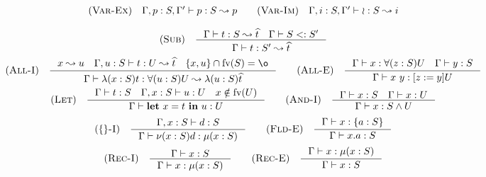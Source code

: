 \[\begin{array}{c}
    \RULE{Var-Ex} \quad \TJ{\Gamma, p: S, \Gamma'}{p}{S}{p} \qquad

    \RULE{Var-Im} \quad \TJ{\Gamma, i: S, \Gamma'}{\IMP}{S}{i} \\[4mm]

    \RULE{Sub} \quad \inference{
        \TJ{\Gamma}{t}{S}{\HAT{t}} \quad
        \SJT{\Gamma}{S}{S'}
    }{
        \TJ{\Gamma}{t}{S'}{\HAT{t}}
    } \\[4mm]

    \RULE{All-I} \quad \inference{
        x \leadsto u \quad
        \TJ{\Gamma, u: S}{t}{U}{\HAT{t}} \quad
        \{x, u\} \cap \FV{S} = \o
    }{
        \TJ{\Gamma}{\ABS{x}{S}{t}}{\DFUN{u}{S}{U}}{\ABS{u}{S}{\HAT{t}}}
    } \qquad

    \RULE{All-E} \quad \inference{
        \TJT{\Gamma}{x}{\DFUN{z}{S}{U}} \quad
        \TJT{\Gamma}{y}{S}
    }{
        \TJT{\Gamma}{x\ y}{\SUB{z}{y}U}
    } \\[4mm]

    \RULE{Let} \quad \inference{
        \TJT{\Gamma}{t}{S} \quad
        \TJT{\Gamma, x: S}{u}{U} \quad
        x \notin \FV{U}
    }{
        \TJT{\Gamma}{\LET{x}{t}{u}}{U}
    } \qquad

    \RULE{And-I} \quad \inference{
        \TJT{\Gamma}{x}{S} \quad
        \TJT{\Gamma}{x}{U}
    }{
        \TJT{\Gamma}{x}{\AGG{S}{U}}
    } \\[4mm]

    \RULE{\{\}-I} \quad \inference{
        \TJT{\Gamma, x: S}{d}{S}
    }{
        \TJT{\Gamma}{\OBJ{x}{S}{d}}{\REC{x}{S}}
    } \qquad

    \RULE{Fld-E} \quad \inference{
        \TJT{\Gamma}{x}{\FDEC{a}{S}}
    }{
        \TJT{\Gamma}{x.a}{S}
    } \\[4mm]

    \RULE{Rec-I} \quad \inference{
        \TJT{\Gamma}{x}{S}
    }{
        \TJT{\Gamma}{x}{\REC{x}{S}}
    } \qquad

    \RULE{Rec-E} \quad \inference{
        \TJT{\Gamma}{x}{\REC{x}{S}}
    }{
        \TJT{\Gamma}{x}{S}
    }
\end{array}\]
